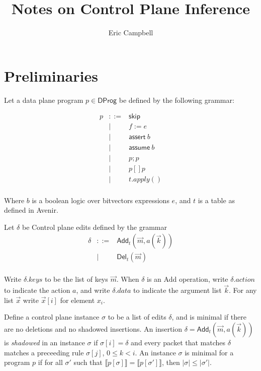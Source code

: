 \documentclass{article}
\title{Notes on Control Plane Inference}
\author{Eric Campbell}
\begin{document}
\maketitle

\section{Preliminaries}

Let a data plane program $p \in \mathsf{DProg}$ be defined by the following grammar:

\[\begin{array}{lcl}
    p & ::= & \mathsf{skip}\\
      & \mid & f := e \\
      & \mid & \mathsf{assert}~b \\
      & \mid & \mathsf{assume}~b \\
      & \mid & p;p \\
      & \mid & p [] p \\
      & \mid & t.apply() \\
  \end{array}
\]

Where $b$ is a boolean logic over bitvectors expressions $e$, and
$t$ is a table as defined in Avenir.

Let $\delta$ be Control plane edits defined by the grammar
\[\begin{array}{lcl}
    \delta & ::= & \mathsf{Add}_t(\vec m,a(\vec k)) \\
           & \mid & \mathsf{Del}_t(\vec m) \\             
  \end{array}\]

Write $\delta.\mathit{keys}$ to be the list of keys $\vec m$. When
$\delta$ is an \textsf{Add} operation, write $\delta.\mathit{action}$
to indicate the action $a$, and write $\delta.\mathit{data}$ to
indicate the argument list $\vec k$. For any list $\vec x$ write
$\vec x[i]$ for element $x_i$.

Define a control plane instance $\sigma$ to be a list of edits
$\delta$, and is minimal if there are no deletions and no shadowed
insertions. An insertion $\delta = \mathsf{Add}_t(\vec m, a(\vec k))$
is \emph{shadowed} in an instance $\sigma$ if $\sigma[i] = \delta$ and
every packet that matches $\delta$ matches a preceeding rule
$\sigma[j]$, $0 \leq k < i$. An instance $\sigma$ is minimal for a
program $p$ if for all $\sigma'$ such that
$\llbracket p[\sigma] \rrbracket = \llbracket p[\sigma'] \rrbracket$,
then $|\sigma| \leq |\sigma'|$.
\end{document}
